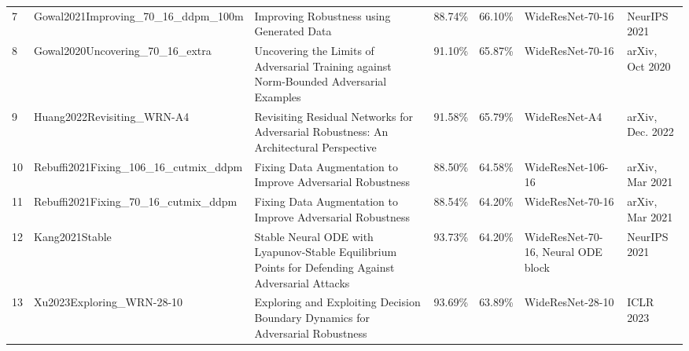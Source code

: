 \begin{table}[]
\begin{tabular}{lllllll}
    7  & Gowal2021Improving\_70\_16\_ddpm\_100m   & Improving Robustness using Generated Data                                                                          & 88.74\%        & 66.10\%         & WideResNet-70-16                                                  & NeurIPS 2021                                               \\
    8  & Gowal2020Uncovering\_70\_16\_extra       & Uncovering the Limits of Adversarial Training against Norm-Bounded Adversarial Examples                            & 91.10\%        & 65.87\%         & WideResNet-70-16                                                  & arXiv, Oct 2020                                            \\
    9  & Huang2022Revisiting\_WRN-A4              & Revisiting Residual Networks for Adversarial Robustness: An Architectural Perspective                              & 91.58\%        & 65.79\%         & WideResNet-A4                                                     & arXiv, Dec. 2022                                           \\
    10 & Rebuffi2021Fixing\_106\_16\_cutmix\_ddpm & Fixing Data Augmentation to Improve Adversarial Robustness                                                         & 88.50\%        & 64.58\%         & WideResNet-106-16                                                 & arXiv, Mar 2021                                            \\
    11 & Rebuffi2021Fixing\_70\_16\_cutmix\_ddpm  & Fixing Data Augmentation to Improve Adversarial Robustness                                                         & 88.54\%        & 64.20\%         & WideResNet-70-16                                                  & arXiv, Mar 2021                                            \\
    12 & Kang2021Stable                           & Stable Neural ODE with Lyapunov-Stable Equilibrium Points for Defending Against Adversarial Attacks                & 93.73\%        & 64.20\%         & WideResNet-70-16, Neural ODE block                                & NeurIPS 2021                                               \\
    13 & Xu2023Exploring\_WRN-28-10               & Exploring and Exploiting Decision Boundary Dynamics for Adversarial Robustness                                     & 93.69\%        & 63.89\%         & WideResNet-28-10                                                  & ICLR 2023                                                  \\

\end{tabular}
\end{table}
